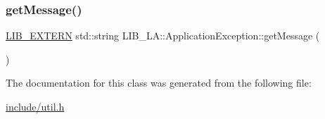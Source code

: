 \subsubsection{\texorpdfstring{get\+Message()}{getMessage()}}
{\footnotesize\ttfamily \hyperlink{libutil_8h_a48cc004c21e097c0d7c1c5fa8dc03b96}{L\+I\+B\+\_\+\+E\+X\+T\+E\+RN} std\+::string L\+I\+B\+\_\+\+L\+A\+::\+Application\+Exception\+::get\+Message (\begin{DoxyParamCaption}{ }\end{DoxyParamCaption})\hspace{0.3cm}{\ttfamily [inline]}}



The documentation for this class was generated from the following file\+:\begin{DoxyCompactItemize}
\item 
\hyperlink{include_2util_8h}{include/util.\+h}\end{DoxyCompactItemize}
